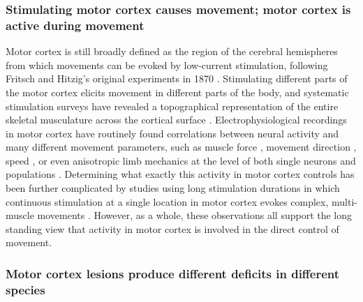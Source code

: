 \subsubsection*{Stimulating motor cortex causes movement; motor cortex is active during movement}

Motor cortex is still broadly defined as the region of the cerebral hemispheres from which movements can be evoked by low-current stimulation, following Fritsch and Hitzig's original experiments in 1870 \cite{Fritsch1870}. Stimulating different parts of the motor cortex elicits movement in different parts of the body, and systematic stimulation surveys have revealed a topographical representation of the entire skeletal musculature across the cortical surface \cite{Leyton1917, Penfield1937, Neafsey1986}. Electrophysiological recordings in motor cortex have routinely found correlations between neural activity and many different movement parameters, such as muscle force \cite{Evarts1968}, movement direction \cite{Georgopoulos1986}, speed \cite{Schwartz1993}, or even anisotropic limb mechanics \cite{Scott2001} at the level of both single neurons \cite{Evarts1968,Churchland2007} and populations \cite{Georgopoulos1986,Churchland2012}. Determining what exactly this activity in motor cortex controls \cite{Todorov2000} has been further complicated by studies using long stimulation durations in which continuous stimulation at a single location in motor cortex evokes complex, multi-muscle movements \cite{Graziano2002,Aflalo2006}. However, as a whole, these observations all support the long standing view that activity in motor cortex is involved in the direct control of movement.

\subsubsection*{Motor cortex lesions produce different deficits in different species}

